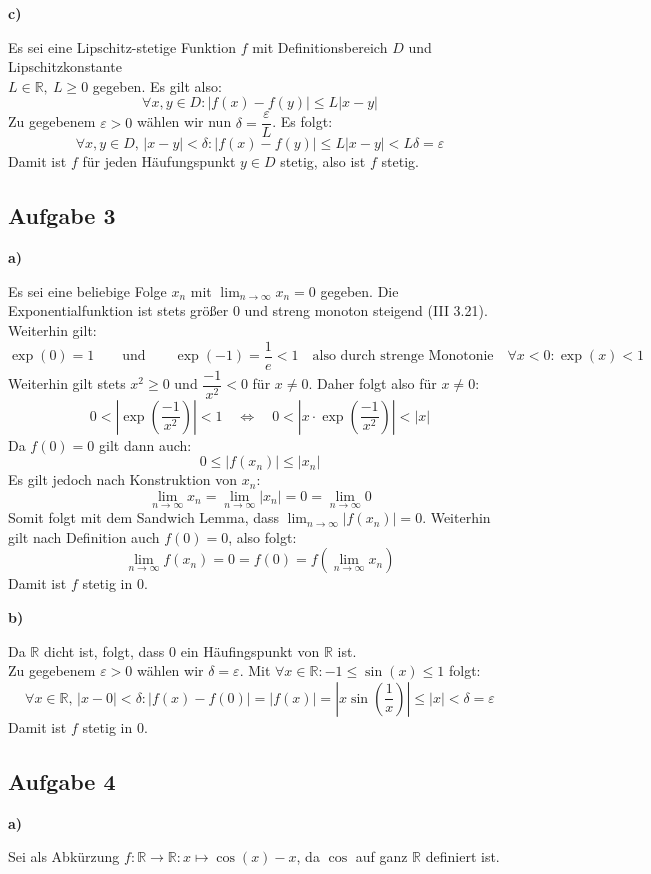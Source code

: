 \documentclass[a4paper,graphics,11pt]{article}
\newcommand{\aufgabe}[1]{\subsection*{Aufgabe #1}}
\begin{document}
\textbf{c)}

Es sei eine Lipschitz-stetige Funktion $f$ mit Definitionsbereich $D$ und Lipschitzkonstante\\
$L \in \mathbb{R},\ L \geq 0$ gegeben. Es gilt also:
$$
    \forall x,y \in D\colon
    |f(x)-f(y)| \leq L|x-y|
$$
Zu gegebenem $\varepsilon > 0$ wählen wir nun $\delta = \dfrac{\varepsilon}{L}$. Es folgt:
$$
    \forall x,y \in D,\,|x-y| < \delta \colon
    |f(x)-f(y)| \leq L|x-y| < L \delta = \varepsilon
$$
Damit ist $f$ für jeden Häufungspunkt $y \in D$ stetig, also ist $f$ stetig.


\aufgabe{3}
\textbf{a)}

Es sei eine beliebige Folge $x_n$ mit $\lim_{n \to \infty}\limits x_n = 0$ gegeben.
Die Exponentialfunktion ist stets größer 0 und streng monoton steigend (III 3.21).
Weiterhin gilt:
$$
    \exp(0) = 1
    \qquad\text{und}\qquad
    \exp(-1) = \frac{1}{e} < 1
    \quad\text{also durch strenge Monotonie}\quad
    \forall x < 0 \colon \exp(x) < 1
$$
Weiterhin gilt stets $x^2 \geq 0$ und $\dfrac{-1}{x^2} < 0$ für $x\neq 0$.
Daher folgt also für $x \neq 0\colon$
$$
    0 < \left|\exp\left(\frac{-1}{x^2}\right)\right| < 1
    \quad \Longleftrightarrow\quad
    0 < \left|x\cdot\exp\left(\frac{-1}{x^2}\right)\right| < |x|
$$
Da $f(0) = 0$ gilt dann auch:
$$
    0 \leq |f(x_n)| \leq |x_n|
$$
Es gilt jedoch nach Konstruktion von $x_n\colon$
$$
    \lim_{n \to \infty}\limits x_n
    = \lim_{n \to \infty}\limits |x_n|
    = 0
    = \lim_{n \to \infty}\limits 0
$$
Somit folgt mit dem Sandwich Lemma, dass $\lim_{n \to \infty}\limits |f(x_n)| = 0$.
Weiterhin gilt nach Definition auch $f(0) = 0$, also folgt:
$$
    \lim_{n \to \infty} f(x_n) = 0 = f(0) = f\left(\lim_{n \to \infty} x_n\right)
$$
Damit ist $f$ stetig in 0.

\textbf{b)}

Da $\mathbb{R}$ dicht ist, folgt, dass 0 ein Häufingspunkt von $\mathbb{R}$ ist.\\
Zu gegebenem $\varepsilon > 0$ wählen wir $\delta = \varepsilon$.
Mit $\forall x \in \mathbb{R}\colon -1 \leq \sin(x) \leq 1$ folgt:
$$
    \forall x \in \mathbb{R},\, |x-0| < \delta\colon
    |f(x) - f(0)| = |f(x)| = \left|x \sin\left(\frac{1}{x}\right)\right|
    \leq |x| < \delta = \varepsilon
$$
Damit ist $f$ stetig in 0.

\newpage

\aufgabe{4}
\textbf{a)}

Sei als Abkürzung $f\colon \mathbb{R} \to \mathbb{R}\colon x \mapsto \cos(x) -x$, da
$\cos$  auf ganz $\mathbb{R}$ definiert ist.
\end{document}
